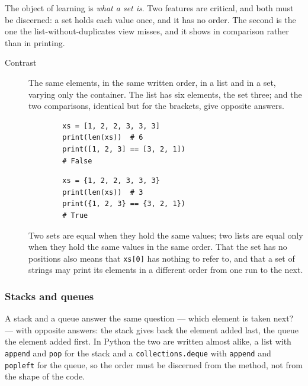 The object of learning is \emph{what a set is}. Two features are critical, and
both must be discerned: a set holds each value once, and it has no order. The
second is the one the list-without-duplicates view misses, and it shows in
comparison rather than in printing.

\begin{description}
  \item[Contrast] The same elements, in the same written order, in a list and
    in a set, varying only the container. The list has six elements, the set
    three; and the two comparisons, identical but for the brackets, give
    opposite answers.

    \hfill
    \begin{minipage}[t]{0.45\columnwidth}
      \begin{verbatim}
        xs = [1, 2, 2, 3, 3, 3]
        print(len(xs))  # 6
        print([1, 2, 3] == [3, 2, 1])
        # False
      \end{verbatim}
    \end{minipage}
    \hfill
    \begin{minipage}[t]{0.45\columnwidth}
      \begin{verbatim}
        xs = {1, 2, 2, 3, 3, 3}
        print(len(xs))  # 3
        print({1, 2, 3} == {3, 2, 1})
        # True
      \end{verbatim}
    \end{minipage}
    \newline
    Two sets are equal when they hold the same values; two lists are equal
    only when they hold the same values in the same order. That the set has
    no positions also means that \texttt{xs[0]} has nothing to
    refer to, and that a set of strings may print its elements in a different
    order from one run to the next.
\end{description}

\subsubsection{Stacks and queues}

A stack and a queue answer the same question --- which element is taken next?
--- with opposite answers: the stack gives back the element added last, the
queue the element added first. In Python the two are written almost alike, a
list with \texttt{append} and \texttt{pop} for the
stack and a \texttt{collections.deque} with
\texttt{append} and \texttt{popleft} for the queue, so
the order must be discerned from the method, not from the shape of the code.

